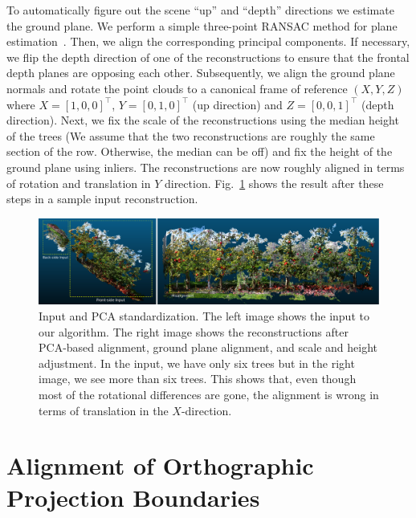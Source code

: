 To automatically figure out the scene ``up'' and ``depth'' directions we estimate the ground plane.
We perform a simple three-point RANSAC method for plane estimation~\cite{yang2010plane}. Then, we align the corresponding principal components. If necessary, we flip the depth direction of one of the reconstructions to ensure that the frontal depth planes are opposing each other. Subsequently, we align the ground plane normals and rotate the point clouds to a canonical frame of reference $(X,Y,Z)$ where $X = [1, 0, 0]^{\top}$, $Y = [0, 1, 0]^{\top}$ (up direction) and $Z = [0, 0, 1]^{\top}$ (depth direction). Next, we fix the scale of the reconstructions using the median height of the trees (We assume that the two reconstructions are roughly the same section of the row. Otherwise, the median can be off) and fix the height of the ground plane using inliers. The reconstructions are now roughly aligned in terms of rotation and translation in $Y$ direction. Fig.~\ref{fig:inputpca} shows the result after these steps in a sample input reconstruction.

\begin{figure}[!htbp]
    \centering
    \includegraphics[width=0.99\columnwidth]{figures/merge_both/input_PCA.pdf}
    \caption[Input and Principal component analysis (PCA) standardization for aligning reconstructions]{Input and PCA standardization. The left image shows the input to our algorithm. The right image shows the reconstructions after PCA-based alignment, ground plane alignment, and scale and height adjustment. In the input, we have only six trees but in the right image, we see more than six trees. This shows that, even though most of the rotational differences are gone, the alignment is wrong in terms of translation in the $X$-direction.}
    \label{fig:inputpca}
\end{figure}



\section{Alignment of Orthographic Projection Boundaries}\label{sec: projsymmetry}

